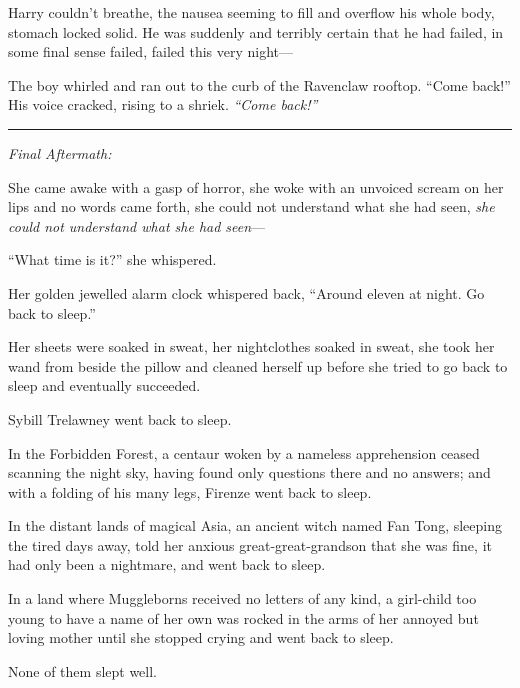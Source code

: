 Harry couldn't breathe, the nausea seeming to fill and overflow his
whole body, stomach locked solid. He was suddenly and terribly certain
that he had failed, in some final sense failed, failed this very
night---

The boy whirled and ran out to the curb of the Ravenclaw rooftop. ``Come
back!'' His voice cracked, rising to a shriek. \emph{``Come back!''}

\begin{center}\rule{3in}{0.4pt}\end{center}

\emph{Final Aftermath:}

She came awake with a gasp of horror, she woke with an unvoiced scream
on her lips and no words came forth, she could not understand what she
had seen, \emph{she could not understand what she had seen}---

``What time is it?'' she whispered.

Her golden jewelled alarm clock whispered back, ``Around eleven at
night. Go back to sleep.''

Her sheets were soaked in sweat, her nightclothes soaked in sweat, she
took her wand from beside the pillow and cleaned herself up before she
tried to go back to sleep and eventually succeeded.

Sybill Trelawney went back to sleep.

In the Forbidden Forest, a centaur woken by a nameless apprehension
ceased scanning the night sky, having found only questions there and no
answers; and with a folding of his many legs, Firenze went back to
sleep.

In the distant lands of magical Asia, an ancient witch named Fan Tong,
sleeping the tired days away, told her anxious great-great-grandson that
she was fine, it had only been a nightmare, and went back to sleep.

In a land where Muggleborns received no letters of any kind, a
girl-child too young to have a name of her own was rocked in the arms of
her annoyed but loving mother until she stopped crying and went back to
sleep.

None of them slept well.
